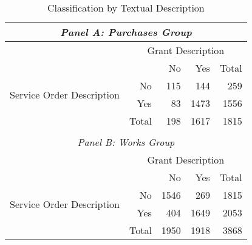 \begin{table}[!htbp]
  \caption{\label{tab:textualdescription}Classification by Textual Description}
  \centering
  \small
  \begin{tabular}{crrrr}
    \hline

    \hline
    \multicolumn{5}{c}{\emph{Panel A: Purchases Group}} \T \B \\
    \hline
    & \multicolumn{4}{c}{\parbox{.25\textwidth}{\centering Grant Description}} \T \B \\
    \multicolumn{1}{c}{\multirow{4}{*}{\parbox[c][][c]{.15\textwidth}{\centering Service Order Description}}} & \multicolumn{1}{l}{} & No & Yes & Total \T \B \\
                         \cline{2-5}
    \multicolumn{1}{c}{} & No        & 115       & 144       & 259  \T \B \\
    \multicolumn{1}{c}{} & Yes       & 83        & 1473      & 1556 \T \B \\
                         \cline{2-5}
    \multicolumn{1}{c}{} & Total     & 198       & 1617      & 1815 \T \B \\
    & & & & \\
    \hline
    \multicolumn{5}{c}{\emph{Panel B: Works Group}} \T \B \\
    \hline
    & \multicolumn{4}{c}{\parbox{.25\textwidth}{\centering Grant Description}} \T \B \\
    \multirow{4}{*}{\parbox[c][][c]{.15\textwidth}{\centering Service Order Description}}                     & \multicolumn{1}{l}{} & No & Yes & Total \T \B \\
                         \cline{2-5}
                         & No        & 1546      & 269       & 1815 \T \B \\
                         & Yes       & 404       & 1649      & 2053 \T \B \\
                         \cline{2-5}
                         & Total     & 1950      & 1918      & 3868 \T \B \\
    \hline

    \hline
  \end{tabular}
\end{table}